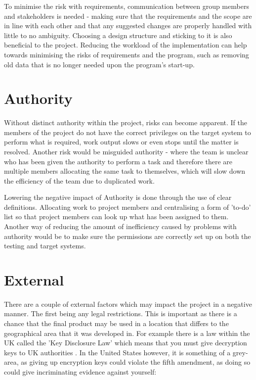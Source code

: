 To minimise the risk with requirements, communication between group members and
stakeholders is needed - making sure that the requirements and the scope are in
line with each other and that any suggested changes are properly handled with
little to no ambiguity.  Choosing a design structure and sticking to it is also
beneficial to the project.  Reducing the workload of the implementation can
help towards minimising the risks of requirements and the program, such as
removing old data that is no longer needed upon the program's start-up.

\section{Authority}
\paragraph{}

Without distinct authority within the project, risks can become apparent.
If the members of the project do not have the correct privileges on the target
system to perform what is required, work output slows or even stops until the
matter is resolved.  Another risk would be misguided authority - where the team
is unclear who has been given the authority to perform a task and therefore 
there are multiple members allocating the same task to themselves, which will
slow down the efficiency of the team due to duplicated work.

Lowering the negative impact of Authority is done through the use of clear
definitions.  Allocating work to project members and centralising a form of
'to-do' list so that project members can look up what has been assigned to them.
Another way of reducing the amount of inefficiency caused by problems with
authority would be to make sure the permissions are correctly set up on both the
testing and target systems.

\section{External}
\paragraph{}

There are a couple of external factors which may impact the project in a
negative manner.  The first being any legal restrictions.  This is important as
there is a chance that the final product may be used in a location that differs
to the geographical area that it was developed in.  For example there is a law
within the UK called the 'Key Disclosure Law' which means that you must give
decryption keys to UK authorities \cite{ukCryptLaw}.  In the United States
however, it is something of a grey-area, as giving up encryption keys could
violate the fifth amendment, as doing so could give incriminating evidence
against yourself:

